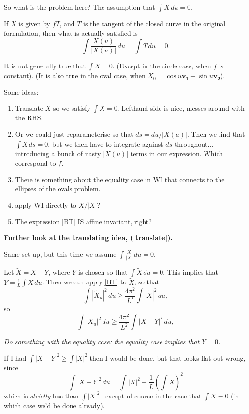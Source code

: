 \documentclass{amsart}
\begin{document}
So what is the problem here?  The assumption that $\int X \,du=0$.   

If $X$ is given by $fT$, and $T$ is the tangent of the closed curve in the original formulation, then what is actually satisfied is 
\[ \int \frac{X(u)}{|X(u)|}\,du = \int T \,du= 0.\]

It is not generally true that $\int X=0$.   (Except in the circle case, when $f$ is constant).   (It is also true in the oval case, when $X_0=\cos u \mathbf{v_1}+ \sin u \mathbf{v_2}$).   

Some ideas:   
\begin{enumerate}
\item Translate $X$ so we satisfy $\int X=0$.  Lefthand side is nice, messes around with the RHS. \label{translate}

\item Or we could just reparameterise so that $ds=du/|X(u)|$.   Then we find that $\int X \,ds=0$, but we then have to integrate against $ds$ throughout... introducing a bunch of nasty $|X(u)|$ terms in our expression.     Which correspond to $f$.

\item There is something about the equality case in WI that connects to the ellipses of the ovals problem.

\item apply WI directly to $X/|X|$?

\item The expression \eqref{BT} IS affine invariant, right?



\end{enumerate}

\textbf{Further look at the translating idea, (\ref{translate}).}

Same set up, but this time we assume $\int \frac{X}{|X|}\,du=0$. 

Let $\tilde{X}=X-Y$, where $Y$ is chosen so that $\int\tilde{X}\, du=0$.    This implies that $Y=\frac1L\int X \,du$.    Then we can apply \eqref{BT} to $\tilde{X}$, so that 
\[  \int |\tilde{X}_u|^2 \,du \ge \frac{4\pi^2}{L^2}\int |\tilde{X}|^2\,du , \]
so
\begin{equation} \int |{X}_u|^2 \,du \ge \frac{4\pi^2}{L^2}\int |{X}-Y|^2\,du , \label{tildy}\end{equation}

\emph{Do something with the equality case:  the equality case implies that $Y=0$.}

If I had $\int|X-Y|^2\ge\int|X|^2$ then I would be done, but that looks flat-out wrong, since 
\[\int |X-Y|^2 \, du = \int |X|^2- \frac1L\left(\int X\right)^2\]
which is \emph{strictly} less than $\int |X|^2$-- except of course in the case that $\int X=0$ (in which case we'd be done already).   
\end{document}
